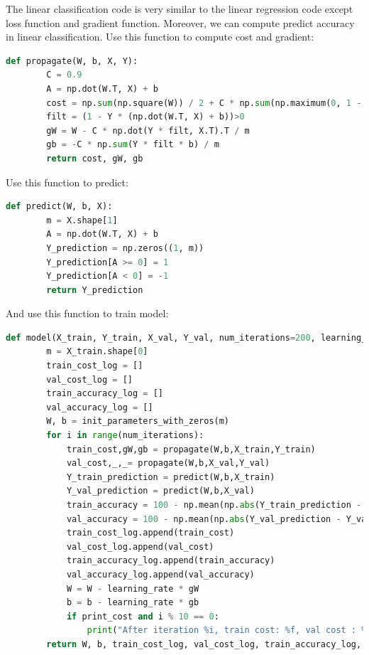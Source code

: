 \documentclass[journal, a4paper]{IEEEtran}
\begin{document}
The linear classification code is very similar to the linear regression code except loss function and gradient function.
Moreover, we can compute predict accuracy in linear classification.
Use this function to compute cost and gradient:
\begin{lstlisting}[language=Python]
    def propagate(W, b, X, Y):
        C = 0.9
        A = np.dot(W.T, X) + b
        cost = np.sum(np.square(W)) / 2 + C * np.sum(np.maximum(0, 1 - Y * (np.dot(W.T, X) + b))) / m
        filt = (1 - Y * (np.dot(W.T, X) + b))>0
        gW = W - C * np.dot(Y * filt, X.T).T / m
        gb = -C * np.sum(Y * filt * b) / m
        return cost, gW, gb
\end{lstlisting}
Use this function to predict:
\begin{lstlisting}[language=Python]
    def predict(W, b, X):
        m = X.shape[1]
        A = np.dot(W.T, X) + b
        Y_prediction = np.zeros((1, m))
        Y_prediction[A >= 0] = 1
        Y_prediction[A < 0] = -1
        return Y_prediction
\end{lstlisting}
And use this function to train model:
\begin{lstlisting}[language=Python]
    def model(X_train, Y_train, X_val, Y_val, num_iterations=200, learning_rate=0.01, print_cost=False):
        m = X_train.shape[0]
        train_cost_log = []
        val_cost_log = []
        train_accuracy_log = []
        val_accuracy_log = []
        W, b = init_parameters_with_zeros(m)
        for i in range(num_iterations):
            train_cost,gW,gb = propagate(W,b,X_train,Y_train)
            val_cost,_,_= propagate(W,b,X_val,Y_val)
            Y_train_prediction = predict(W,b,X_train)
            Y_val_prediction = predict(W,b,X_val)
            train_accuracy = 100 - np.mean(np.abs(Y_train_prediction - Y_train) / 2) * 100
            val_accuracy = 100 - np.mean(np.abs(Y_val_prediction - Y_val) / 2) * 100
            train_cost_log.append(train_cost)
            val_cost_log.append(val_cost)
            train_accuracy_log.append(train_accuracy)
            val_accuracy_log.append(val_accuracy)
            W = W - learning_rate * gW
            b = b - learning_rate * gb
            if print_cost and i % 10 == 0:
                print("After iteration %i, train cost: %f, val cost : %f， train accuracy: %f %%, test accuracy: %f %%" % (i, train_cost, val_cost, train_accuracy, val_accuracy))
        return W, b, train_cost_log, val_cost_log, train_accuracy_log, val_accuracy_log
\end{lstlisting}
\end{document}
